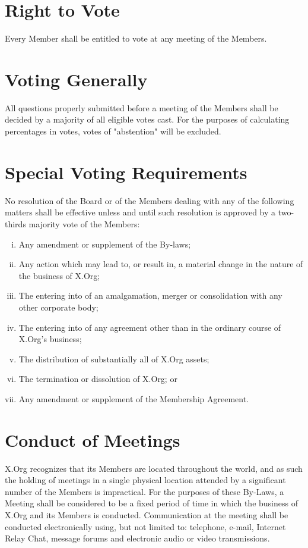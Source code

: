 \documentclass[10pt, english]{bylaws}
\begin{document}
\section{Right to Vote}
Every Member shall be entitled to vote at any meeting of the Members.

\section{Voting Generally}
All questions properly submitted before a meeting of the Members shall be decided
by a majority of all eligible votes cast.  For the purposes of calculating
percentages in votes, votes of "abstention" will be excluded.

\section{Special Voting Requirements}
\label{section_voting_requirements}

No resolution of the Board or of the Members dealing with any of the following
matters shall be effective unless and until such resolution is approved by a
two-thirds majority vote of the Members:

\begin{enumerate}[(i)\hspace{.2cm}]
	\item Any amendment or supplement of the By-laws;

	\item Any action which may lead to, or result in, a material change
	in the nature of the business of X.Org;

	\item The entering into of an amalgamation, merger or consolidation with
	any other corporate body;

	\item The entering into of any agreement other than in the ordinary
	course of X.Org's business;

	\item The distribution of substantially all of X.Org assets;

	\item The termination or dissolution of X.Org; or

	\item Any amendment or supplement of the Membership Agreement.
\end{enumerate}

\section{Conduct of Meetings}
X.Org recognizes that its Members are located throughout the world, and as such
the holding of meetings in a single physical location attended by a significant
number of the Members is impractical. For the purposes of these By-Laws, a
Meeting shall be considered to be a fixed period of time in which the business
of X.Org and its Members is conducted. Communication at the meeting shall be
conducted electronically using, but not limited to: telephone, e-mail, Internet
Relay Chat, message forums and electronic audio or video transmissions.
\end{document}
